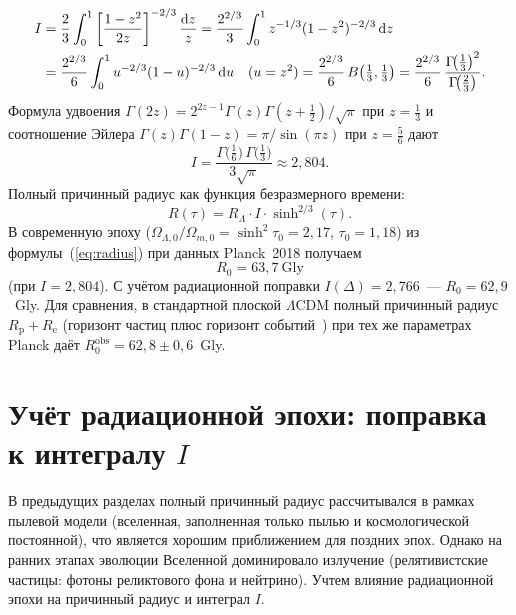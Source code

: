 \documentclass[12pt,a4paper]{article}
\begin{document}
\begin{align}
I &= \frac{2}{3}\int_0^1\left[\frac{1-z^2}{2z}\right]^{-2/3}\frac{\mathrm{d}z}{z}
   = \frac{2^{2/3}}{3}\int_0^1 z^{-1/3}(1-z^2)^{-2/3}\,\mathrm{d}z \notag\\
  &= \frac{2^{2/3}}{6}\int_0^1 u^{-2/3}(1-u)^{-2/3}\,\mathrm{d}u
   \quad (u=z^2)
   = \frac{2^{2/3}}{6}\,B\!\left(\tfrac{1}{3},\tfrac{1}{3}\right)
   = \frac{2^{2/3}}{6}\,\frac{\Gamma\!\bigl(\tfrac{1}{3}\bigr)^2}{\Gamma\!\bigl(\tfrac{2}{3}\bigr)}.
\end{align}
Формула удвоения $\Gamma(2z)=2^{2z-1}\Gamma(z)\Gamma(z+\tfrac12)/\sqrt{\pi}$ при $z=\tfrac13$ и соотношение Эйлера $\Gamma(z)\Gamma(1-z)=\pi/\sin(\pi z)$ при $z=\tfrac56$ дают
\begin{equation}
\boxed{I = \frac{\Gamma\!\bigl(\tfrac{1}{6}\bigr)\,\Gamma\!\bigl(\tfrac{1}{3}\bigr)}{3\sqrt{\pi}} \approx 2{,}804.}
\end{equation}
Полный причинный радиус как функция безразмерного времени:
\begin{equation}
\boxed{R(\tau) = R_\Lambda \cdot I \cdot \sinh^{2/3}(\tau).} \label{eq:radius}
\end{equation}
В современную эпоху ($\Omega_{\Lambda,0}/\Omega_{m,0}=\sinh^2\tau_0=2{,}17$, $\tau_0=1{,}18$) из формулы~(\ref{eq:radius}) при данных Planck~2018 получаем
\begin{equation}
\boxed{R_0 = 63{,}7~\text{Gly}}
\end{equation}
(при $I=2{,}804$). С учётом радиационной поправки $I(\Delta)=2{,}766$~--- $R_0=62{,}9$~Gly. Для сравнения, в стандартной плоской $\Lambda$CDM полный причинный радиус $R_{\mathrm{p}}+R_{\mathrm{e}}$ (горизонт частиц плюс горизонт событий~\cite{Davis2004}) при тех же параметрах Planck даёт $R_0^{\mathrm{obs}}=62{,}8\pm 0{,}6$~Gly.

\section{Учёт радиационной эпохи: поправка к интегралу \texorpdfstring{$I$}{I}}
\label{sec:radcorr}

В предыдущих разделах полный причинный радиус рассчитывался в рамках пылевой модели (вселенная, заполненная только пылью и космологической постоянной), что является хорошим приближением для поздних эпох. Однако на ранних этапах эволюции Вселенной доминировало излучение (релятивистские частицы: фотоны реликтового фона и нейтрино). Учтем влияние радиационной эпохи на причинный радиус и интеграл $I$.
\end{document}
